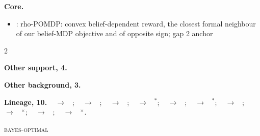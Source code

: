 \documentclass[10pt]{article}
\newcommand{\memb}[1]{\par\smallskip\textbf{#1}\quad}
\begin{document}
\memb{Core.}
\begin{itemize}[nosep,leftmargin=1.2em]
\item \citet{Araya-pomdp10}: rho-POMDP: convex belief-dependent reward, the closest formal neighbour of our belief-MDP objective and of opposite sign; gap 2 anchor
\end{itemize}
\begin{multicols}{2}
\memb{Other support, 4.} \citetext{\citealp{Hijab-entropy84}; \citealp{Feng-active97}; \citealp{Spaan-decisiontheoretic15}; \citealp{Greigarn-taskoriented19}}

\memb{Other background, 3.} {\footnotesize \citetext{\citealp{Satsangi-exploiting18}; \citealp{Molloy-active21}; \citealp{Molloy-smoother21}}}

\end{multicols}
\memb{Lineage, 10.} {\footnotesize \citeauthor{Bellman-adaptive59}~\citeyear{Bellman-adaptive59} $\to$ \citeauthor{Hijab-entropy84}~\citeyear{Hijab-entropy84}; \citeauthor{Hijab-entropy84}~\citeyear{Hijab-entropy84} $\to$ \citeauthor{Feng-active97}~\citeyear{Feng-active97}; \citeauthor{Kaelbling-planning98}~\citeyear{Kaelbling-planning98} $\to$ \citeauthor{Araya-pomdp10}~\citeyear{Araya-pomdp10}; \citeauthor{Araya-pomdp10}~\citeyear{Araya-pomdp10} $\to$ \citeauthor{Spaan-decisiontheoretic15}~\citeyear{Spaan-decisiontheoretic15}$^\ast$; \citeauthor{Araya-pomdp10}~\citeyear{Araya-pomdp10} $\to$ \citeauthor{Satsangi-exploiting18}~\citeyear{Satsangi-exploiting18}; \citeauthor{Araya-pomdp10}~\citeyear{Araya-pomdp10} $\to$ \citeauthor{Greigarn-taskoriented19}~\citeyear{Greigarn-taskoriented19}$^\ast$; \citeauthor{Araya-pomdp10}~\citeyear{Araya-pomdp10} $\to$ \citeauthor{Molloy-smoother21}~\citeyear{Molloy-smoother21}; \citeauthor{Araya-pomdp10}~\citeyear{Araya-pomdp10} $\to$ \citeauthor{Cooper-expected26}~\citeyear{Cooper-expected26}$^\times$; \citeauthor{Wei-value24}~\citeyear{Wei-value24} $\to$ \citeauthor{Araya-pomdp10}~\citeyear{Araya-pomdp10}; \citeauthor{Cooper-expected26}~\citeyear{Cooper-expected26} $\to$ \citeauthor{Araya-pomdp10}~\citeyear{Araya-pomdp10}$^\times$.}

\medskip\textsc{bayes-optimal}
\end{document}
